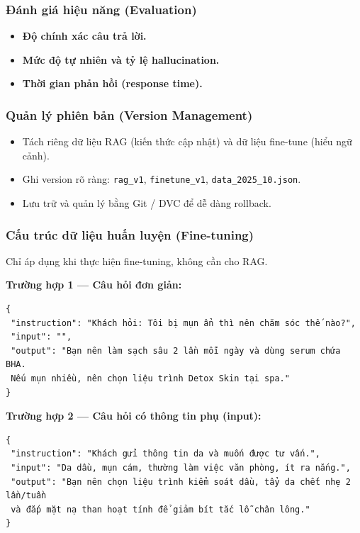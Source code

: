 \subsubsection{Đánh giá hiệu năng (Evaluation)}
\begin{itemize}
    \item \textbf{Độ chính xác câu trả lời.}
    \item \textbf{Mức độ tự nhiên và tỷ lệ hallucination.}
    \item \textbf{Thời gian phản hồi (response time).}
\end{itemize}

\subsubsection{Quản lý phiên bản (Version Management)}
\begin{itemize}
    \item Tách riêng dữ liệu RAG (kiến thức cập nhật) và dữ liệu fine-tune (hiểu ngữ cảnh).  
    \item Ghi version rõ ràng: \texttt{rag\_v1}, \texttt{finetune\_v1}, \texttt{data\_2025\_10.json}.  
    \item Lưu trữ và quản lý bằng Git / DVC để dễ dàng rollback.  
\end{itemize}

\subsubsection{Cấu trúc dữ liệu huấn luyện (Fine-tuning)}
Chỉ áp dụng khi thực hiện fine-tuning, không cần cho RAG.

\noindent
\textbf{Trường hợp 1 — Câu hỏi đơn giản:}
\begin{verbatim}
{
 "instruction": "Khách hỏi: Tôi bị mụn ẩn thì nên chăm sóc thế nào?",
 "input": "",
 "output": "Bạn nên làm sạch sâu 2 lần mỗi ngày và dùng serum chứa BHA.
 Nếu mụn nhiều, nên chọn liệu trình Detox Skin tại spa."
}
\end{verbatim}

\noindent
\textbf{Trường hợp 2 — Câu hỏi có thông tin phụ (input):}
\begin{verbatim}
{
 "instruction": "Khách gửi thông tin da và muốn được tư vấn.",
 "input": "Da dầu, mụn cám, thường làm việc văn phòng, ít ra nắng.",
 "output": "Bạn nên chọn liệu trình kiểm soát dầu, tẩy da chết nhẹ 2 lần/tuần
 và đắp mặt nạ than hoạt tính để giảm bít tắc lỗ chân lông."
}
\end{verbatim}

